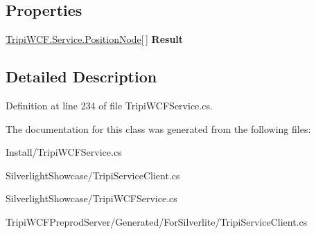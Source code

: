 \subsection*{Properties}
\begin{DoxyCompactItemize}
\item 
\hypertarget{class_get_position_nodes_for_trip_completed_event_args_a6991d249b98ad61c5845890450a73497}{
\hyperlink{class_tripi_w_c_f_1_1_service_1_1_position_node}{TripiWCF.Service.PositionNode}\mbox{[}$\,$\mbox{]} {\bfseries Result}}
\label{class_get_position_nodes_for_trip_completed_event_args_a6991d249b98ad61c5845890450a73497}

\end{DoxyCompactItemize}


\subsection{Detailed Description}


Definition at line 234 of file TripiWCFService.cs.

The documentation for this class was generated from the following files:\begin{DoxyCompactItemize}
\item 
Install/TripiWCFService.cs\item 
SilverlightShowcase/TripiServiceClient.cs\item 
SilverlightShowcase/TripiWCFService.cs\item 
TripiWCFPreprodServer/Generated/ForSilverlite/TripiServiceClient.cs\end{DoxyCompactItemize}
